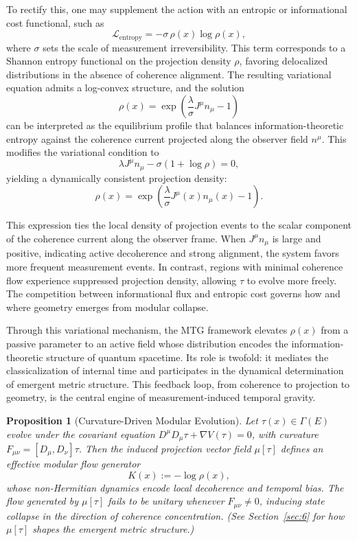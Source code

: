 \documentclass[11pt]{article}
\newtheorem{proposition}{Proposition}
\begin{document}
To rectify this, one may supplement the action with an entropic or informational cost functional, such as
\begin{equation}
\mathcal{L}_{\mathrm{entropy}} = -\sigma \, \rho(x) \log \rho(x),
\end{equation}
where \( \sigma \) sets the scale of measurement irreversibility. This term corresponds to a Shannon entropy functional on the projection density \( \rho \), favoring delocalized distributions in the absence of coherence alignment. The resulting variational equation admits a log-convex structure, and the solution
\[
\rho(x) = \exp\left( \frac{\lambda}{\sigma} J^\mu n_\mu - 1 \right)
\]
can be interpreted as the equilibrium profile that balances information-theoretic entropy against the coherence current projected along the observer field \( n^\mu \). This modifies the variational condition to
\begin{equation}
\lambda J^\mu n_\mu - \sigma (1 + \log \rho) = 0,
\end{equation}
yielding a dynamically consistent projection density:
\begin{equation}
\rho(x) = \exp\left( \frac{\lambda}{\sigma} J^\mu(x) n_\mu(x) - 1 \right).
\end{equation}


This expression ties the local density of projection events to the scalar component of the coherence current along the observer frame. When \( J^\mu n_\mu \) is large and positive, indicating active decoherence and strong alignment, the system favors more frequent measurement events. In contrast, regions with minimal coherence flow experience suppressed projection density, allowing \( \tau \) to evolve more freely. The competition between informational flux and entropic cost governs how and where geometry emerges from modular collapse.

Through this variational mechanism, the MTG framework elevates \( \rho(x) \) from a passive parameter to an active field whose distribution encodes the information-theoretic structure of quantum spacetime. Its role is twofold: it mediates the classicalization of internal time and participates in the dynamical determination of emergent metric structure. This feedback loop, from coherence to projection to geometry, is the central engine of measurement-induced temporal gravity.

\begin{proposition}[Curvature-Driven Modular Evolution]
Let \( \tau(x) \in \Gamma(E) \) evolve under the covariant equation \( D^\mu D_\mu \tau + \nabla V(\tau) = 0 \), with curvature \( F_{\mu\nu} = [D_\mu, D_\nu] \tau \). Then the induced projection vector field \( \mu[\tau] \) defines an effective modular flow generator
\[
K(x) := - \log \rho(x),
\]
whose non-Hermitian dynamics encode local decoherence and temporal bias. The flow generated by \( \mu[\tau] \) fails to be unitary whenever \( F_{\mu\nu} \neq 0 \), inducing state collapse in the direction of coherence concentration. (See Section~\ref{sec:6} for how \( \mu[\tau] \) shapes the emergent metric structure.)
\end{proposition}
\end{document}
